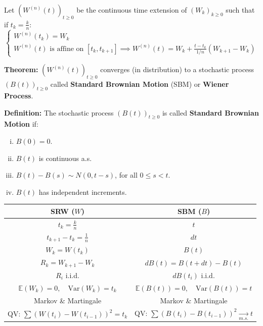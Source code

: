 Let \((W^{(n)}(t))_{t \ge 0}\) be the continuous time extension of \((W_k)_{k \ge 0}\) such that if \(t_k = \frac{k}{n}\):
\begin{equation*}
    \begin{cases}
        W^{(n)}(t_k) = W_k \\
        W^{(n)}(t) \text{ is affine on } [t_k, t_{k+1}] \implies W^{(n)}(t) = W_k + \frac{t - t_k}{1/n}(W_{k+1} - W_k)
    \end{cases}
\end{equation*}

\textbf{Theorem: } \((W^{(n)}(t))_{t \ge 0}\) converges (in distribution) to a stochastic process \((B(t))_{t \ge 0}\) called \textbf{Standard Brownian Motion} (SBM) or \textbf{Wiener Process}.

\begin{framed}
\textbf{Definition: } The stochastic process \((B(t))_{t \ge 0}\) is called \textbf{Standard Brownian Motion} if:
\begin{enumerate}[i.]
    \item \(B(0) = 0\).
    \item \(B(t)\) is continuous a.s.
    \item \(B(t) - B(s) \sim N(0, t-s)\), for all \(0 \le s < t\).
    \item \(B(t)\) has independent increments.
\end{enumerate}
\end{framed}

\begin{center}
\renewcommand{\arraystretch}{1.3}
\begin{tabular}{c c}
    \toprule
    \textbf{SRW} ($W$) & \textbf{SBM} ($B$) \\
    \midrule
    $t_k = \frac{k}{n}$ & $t$ \\
    $t_{k+1} - t_k = \frac{1}{n}$ & $dt$ \\
    $W_k = W(t_k)$ & $B(t)$ \\
    $R_k = W_{k+1} - W_k$ & $dB(t) = B(t+dt) - B(t)$ \\
    $R_i$ i.i.d. & $dB(t_i)$ i.i.d. \\
    $\mathbb{E}(W_k) = 0, \quad \text{Var}(W_k) = t_k$ & $\mathbb{E}(B(t)) = 0, \quad \text{Var}(B(t)) = t$ \\
    Markov \& Martingale & Markov \& Martingale \\
    QV: $\sum (W(t_i) - W(t_{i-1}))^2 = t_k$ & QV: $\sum (B(t_i) - B(t_{i-1}))^2 \xrightarrow[m.s.]{} t$ \\
    \bottomrule
\end{tabular}
\end{center}

